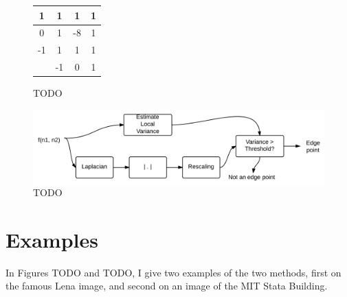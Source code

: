 \documentclass[12pt]{amsart}
\begin{document}
\begin{figure}
\centering
\begin{tabular}{c || c | c | c }
1 & 1 & 1 & 1 \\
\hline
0 & 1 & -8 & 1 \\
\hline
-1 & 1 & 1 & 1 \\
\hline\hline
& -1 & 0 & 1 \\
\end{tabular}
\caption{TODO}
\label{fig:TODO}
\end{figure}

\begin{figure}
\centering
\includegraphics[width=\linewidth]{LaplacianMethod.png}
\caption{TODO}
\label{fig:TODO}
\end{figure}

\section{Examples}

In Figures TODO and TODO, I give two examples of the two methods, first on the famous Lena image, and second on an image of the MIT Stata Building.
\end{document}
